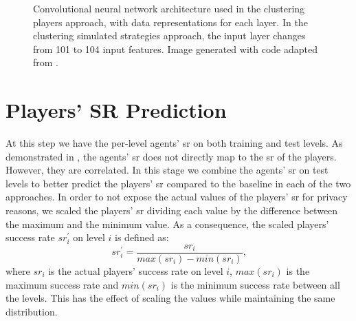 \begin{figure}
    \centering
    
%    
    \caption{Convolutional neural network architecture used in the clustering players approach, with data representations for each layer. In the clustering simulated strategies approach, the input layer changes from 101 to 104 input features. Image generated with code adapted from \cite{eisen_simulating_2017}.} 
    \label{fig:network_architecture}
\end{figure}


\section{Players' SR Prediction}
At this step we have the per-level agents' \acs{sr} on both training and test levels. As demonstrated in \cite{eisen_simulating_2017}, the agents' \acs{sr} does not directly map to the \acs{sr} of the players. However, they are correlated. In this stage we combine the agents' \acs{sr} on test levels to better predict the players' \acs{sr} compared to the baseline in each of the two approaches. In order to not expose the actual values of the players' \acs{sr} for privacy reasons, we scaled the players' \acs{sr} dividing each value by the difference between the maximum and the minimum value.
As a consequence, the scaled players' success rate $sr_i^\prime$ on level $i$ is defined as:
\begin{equation}\label{eq:scaled_sr}
    sr_i^\prime = \frac{sr_i}{max(sr_i) - min(sr_i)} \text{,}
\end{equation}
where $sr_i$ is the actual players' success rate on level $i$, $max(sr_i)$ is the maximum success rate and $min(sr_i)$ is the minimum success rate between all the levels. This has the effect of scaling the values while maintaining the same distribution.
